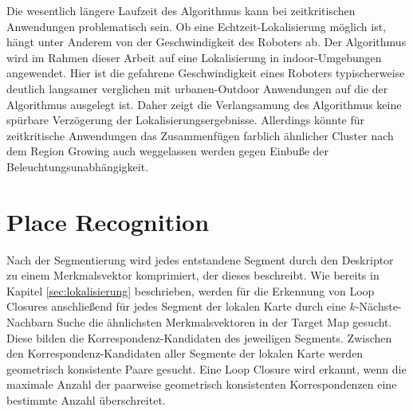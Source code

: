 Die wesentlich längere Laufzeit des Algorithmus kann bei zeitkritischen Anwendungen problematisch sein. Ob eine Echtzeit-Lokalisierung möglich ist, hängt unter Anderem von der Geschwindigkeit des Roboters ab. Der Algorithmus wird im Rahmen dieser Arbeit auf eine Lokalisierung in indoor-Umgebungen angewendet. Hier ist die gefahrene Geschwindigkeit eines Roboters typischerweise deutlich langsamer verglichen mit urbanen-Outdoor Anwendungen auf die der Algorithmus ausgelegt ist. Daher zeigt die Verlangsamung des Algorithmus keine spürbare Verzögerung der \linebreak Lokalisierungsergebnisse. Allerdings könnte für zeitkritische Anwendungen das Zusammenfügen farblich ähnlicher Cluster nach dem Region Growing auch weggelassen werden gegen Einbuße der Beleuchtungsunabhängigkeit.



\section[Place Recognition (Kopp)]{Place Recognition}
\label{sec:Place Recognition}

Nach der Segmentierung wird jedes entstandene Segment durch den Deskriptor zu einem Merkmalsvektor komprimiert, der dieses beschreibt. Wie bereits in Kapitel \ref{sec:lokalisierung} beschrieben, werden für die Erkennung von Loop Closures anschließend für jedes Segment der lokalen Karte durch eine $k$-Nächste-Nachbarn Suche die ähnlichsten Merkmalsvektoren in der Target Map gesucht. Diese bilden die Korrespondenz-Kandidaten des jeweiligen Segments. Zwischen den Korrespondenz-Kandidaten aller Segmente der lokalen Karte werden geometrisch konsistente Paare gesucht. Eine Loop Closure wird erkannt, wenn die maximale Anzahl der paarweise geometrisch konsistenten Korrespondenzen eine bestimmte Anzahl überschreitet. 

